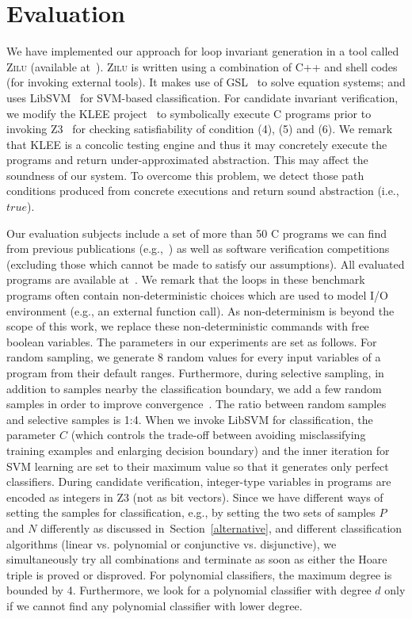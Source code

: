 \section{Evaluation} %
\label{sec:evaluations}
We have implemented our approach for loop invariant generation in a tool called \textsc{Zilu} (available at~\cite{zilu:repo}).
\textsc{Zilu} is written using a combination of C++ and shell codes (for invoking external tools). It makes use of GSL~\cite{gough2009gnu} to solve equation systems; and uses LibSVM~\cite{chang2011libsvm} for SVM-based classification. For candidate invariant verification, we modify the KLEE project~\cite{cadar2008klee} to symbolically execute C programs prior to invoking Z3~\cite{de2008z3} for checking satisfiability of
condition (4), (5) and (6). We remark that KLEE is a concolic testing engine and thus it may concretely execute the programs and return under-approximated abstraction. This may affect the soundness of our system.
To overcome this problem, we detect those path conditions produced from concrete executions and return sound abstraction (i.e., $true$). %

Our evaluation subjects include a set of more than 50 C programs we can find from previous publications (e.g.,~\cite{DBLP:conf/pldi/GulwaniSV08,sharma2012interpolants,gulavani2008automatically,jeannet2010interproc,isil2013inductive}) as well as software verification competitions~\cite{Dirk:SVCOMP:2016} %
 (excluding those which cannot be made to satisfy our assumptions). All evaluated programs are available at~\cite{zilu:repo}. We remark that the loops in these benchmark programs often contain non-deterministic choices which are used to model I/O environment (e.g., an external function call). As non-determinism is beyond the scope of this work, we replace these non-deterministic commands with free boolean variables. The parameters in our experiments are set as follows. For random sampling, we generate 8 random values for every input variables of a program from their default ranges. Furthermore, during selective sampling, in addition to samples nearby the classification boundary, we add a few random samples in order to improve convergence~\cite{DBLP:conf/icml/SchohnC00}. The ratio between random samples and selective samples is 1:4. When we invoke LibSVM for classification, the parameter $C$ (which controls the trade-off between avoiding misclassifying training examples and enlarging decision boundary) and the inner iteration for SVM learning are set to their maximum value so that it generates only perfect classifiers. During candidate verification, integer-type variables in programs are encoded as integers in Z3 (not as bit vectors). Since we have different ways of setting the samples for classification, e.g., by setting the two sets of samples $P$ and $N$ differently as discussed in~Section~\ref{alternative}, and different classification algorithms (linear vs. polynomial or conjunctive vs. disjunctive), we simultaneously try all combinations and terminate as soon as either the Hoare triple is proved or disproved. For polynomial classifiers, the maximum degree is bounded by 4. Furthermore, we look for a polynomial classifier with degree $d$ only if we cannot find any polynomial classifier with lower degree.

